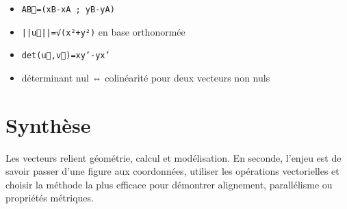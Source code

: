 \begin{itemize}
\item \texttt{AB⃗=(xB-xA ; yB-yA)}
\item \texttt{||u⃗||=√(x²+y²)} en base orthonormée
\item \texttt{det(u⃗,v⃗)=xy'-yx'}
\item déterminant nul ⇔ colinéarité pour deux vecteurs non nuls
\end{itemize}

\section{Synthèse}

Les vecteurs relient géométrie, calcul et modélisation. En seconde, l'enjeu est de savoir passer d'une figure aux coordonnées, utiliser les opérations vectorielles et choisir la méthode la plus efficace pour démontrer alignement, parallélisme ou propriétés métriques.
